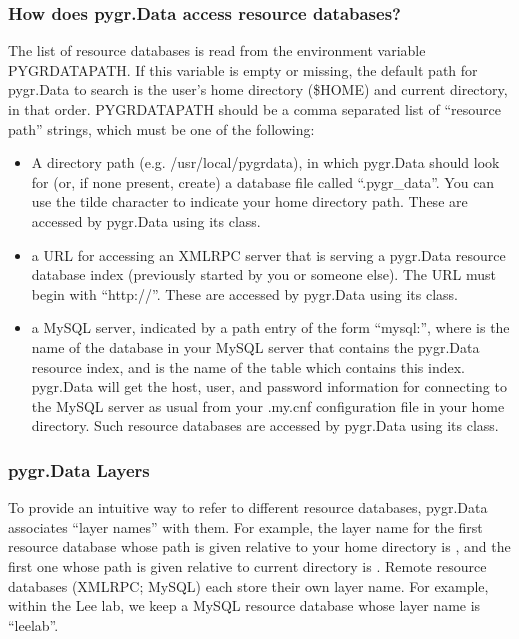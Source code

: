 \documentclass{howto}
\begin{document}
\subsubsection{How does pygr.Data access resource databases?}
The list of resource databases is read from the environment variable
PYGRDATAPATH.  If this variable is empty or missing, the default path
for pygr.Data to search is the user's home directory (\$HOME) and
current directory, in that order.  PYGRDATAPATH should be a comma separated list
of ``resource path'' strings, which must be one of the following:
\begin{itemize}
\item A directory path (e.g. /usr/local/pygrdata), in which pygr.Data should
look for (or, if none present, create) a database file called ``.pygr_data''.  
You can use the tilde character to indicate your home directory path.
These are accessed by pygr.Data using its  class.

\item a URL for accessing an XMLRPC server that is serving a pygr.Data
resource database index (previously started by you or someone else).
The URL must begin with ``http://''.
These are accessed by pygr.Data using its  class.

\item a MySQL server, indicated by a path entry of the form 
``mysql:'',
where  is the name of the database in your MySQL
server that contains the pygr.Data resource index,
and  is the name of the table which contains this index.
pygr.Data will get the host, user, and password information for connecting 
to the MySQL server as usual from your
.my.cnf configuration file in your home directory.
Such resource databases are accessed by pygr.Data using its 
 class.
\end{itemize}

\subsubsection{pygr.Data Layers}
To provide an intuitive way to refer to different resource databases,
pygr.Data associates ``layer names'' with them.  For example, the layer
name for the first resource database whose path is given relative to 
your home directory is , and the first one whose path is given
relative to current directory is .  Remote resource databases
(XMLRPC; MySQL) each store their own layer name.  For example, within the
Lee lab, we keep a MySQL resource database whose layer name is ``leelab''.
\end{document}
